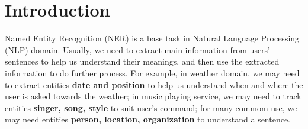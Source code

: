 \documentclass[letterpaper]{article} %
\begin{document}
%
%
%

\section{Introduction}
Named Entity Recognition (NER) is a base task in Natural Language Processing (NLP) domain. Usually, we need to extract main information from users' sentences to help us understand their meanings, and then use the extracted information to do further process. For example, in weather domain, we may need to extract entities \textbf{date and position} to help us understand when and where the user is asked towards the weather; in music playing service, we may need to track entities \textbf{singer, song, style}  to suit user's command; for many commom use, we may need entities \textbf{person, location, organization} to understand a sentence.
\end{document}
